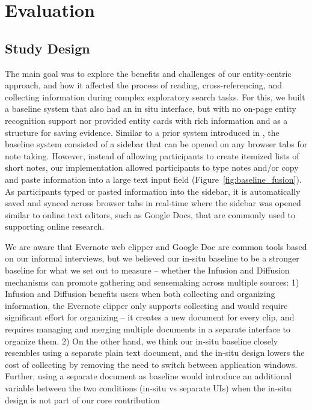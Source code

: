 

\section{Evaluation}

\subsection{Study Design}


The main goal was to explore the benefits and challenges of our entity-centric approach, and how it affected the process of reading, cross-referencing, and collecting information during complex exploratory search tasks.
For this, we built a baseline system that also had an in situ interface, but with no on-page entity recognition support nor provided entity cards with rich information and as a structure for saving evidence. Similar to a prior system introduced in \cite{notetoself}, the baseline system consisted of a sidebar that can be opened on any browser tabs for note taking. However, instead of allowing participants to create itemized lists of short notes, our implementation allowed participants to type notes and/or copy and paste information into a large text input field (Figure~\ref{fig:baseline_fusion}). As participants typed or pasted information into the sidebar, it is automatically saved and synced across browser tabs in real-time where the sidebar was opened similar to online text editors, such as Google Docs, that are commonly used to supporting online research.

We are aware that Evernote web clipper and Google Doc are common tools based on our informal interviews, but we believed our in-situ baseline to be a stronger baseline for what we set out to measure -- whether the Infusion and Diffusion mechanisms can promote gathering and sensemaking across multiple sources: 1) Infusion and Diffusion benefits users when both collecting and organizing information, the Evernote clipper only supports collecting and would require significant effort for organizing --  it creates a new document for every clip, and requires managing and merging multiple documents in a separate interface to organize them. 2) On the other hand, we think our in-situ baseline closely resembles using a separate plain text document, and the in-situ design lowers the cost of collecting by removing the need to switch between application windows. Further, using a separate document as baseline would introduce an additional variable between the two conditions (in-situ vs separate UIs) when the in-situ design is not part of our core contribution

